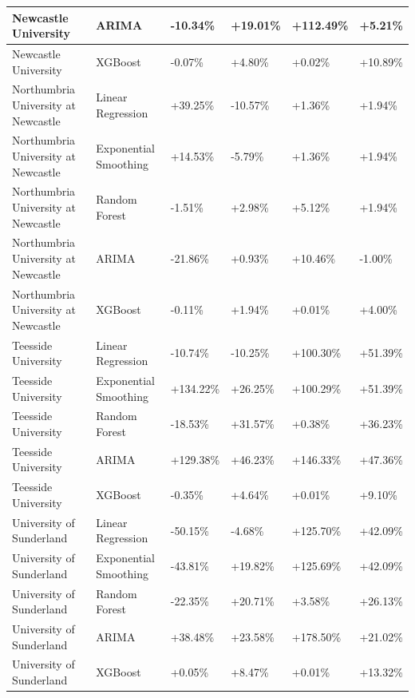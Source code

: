 \documentclass[journal,onecolumn, 10pt,draftclsnofoot]{IEEEtran}
\begin{document}
\begin{table}[h]
{\begin{tabular}{|l|l|l|l|l|l|}
\hline Newcastle University & ARIMA & -10.34\% & +19.01\% & +112.49\% & +5.21\% \\
\hline Newcastle University & XGBoost & -0.07\% & +4.80\% & +0.02\% & +10.89\% \\
\hline Northumbria University at Newcastle & Linear Regression & +39.25\% & -10.57\% & +1.36\% & +1.94\% \\
\hline Northumbria University at Newcastle & Exponential Smoothing & +14.53\% & -5.79\% & +1.36\% & +1.94\% \\
\hline Northumbria University at Newcastle & Random Forest & -1.51\% & +2.98\% & +5.12\% & +1.94\% \\
\hline Northumbria University at Newcastle & ARIMA & -21.86\% & +0.93\% & +10.46\% & -1.00\% \\
\hline Northumbria University at Newcastle & XGBoost & -0.11\% & +1.94\% & +0.01\% & +4.00\% \\
\hline Teesside University & Linear Regression & -10.74\% & -10.25\% & +100.30\% & +51.39\% \\
\hline Teesside University & Exponential Smoothing & +134.22\% & +26.25\% & +100.29\% & +51.39\% \\
\hline Teesside University & Random Forest & -18.53\% & +31.57\% & +0.38\% & +36.23\% \\
\hline Teesside University & ARIMA & +129.38\% & +46.23\% & +146.33\% & +47.36\% \\
\hline Teesside University & XGBoost & -0.35\% & +4.64\% & +0.01\% & +9.10\% \\
\hline University of Sunderland & Linear Regression & -50.15\% & -4.68\% & +125.70\% & +42.09\% \\
\hline University of Sunderland & Exponential Smoothing & -43.81\% & +19.82\% & +125.69\% & +42.09\% \\
\hline University of Sunderland & Random Forest & -22.35\% & +20.71\% & +3.58\% & +26.13\% \\
\hline University of Sunderland & ARIMA & +38.48\% & +23.58\% & +178.50\% & +21.02\% \\
\hline University of Sunderland & XGBoost & +0.05\% & +8.47\% & +0.01\% & +13.32\% \\
\hline
\end{tabular}
}
\label{tab:forecasted-trends}
\end{table}
\end{document}
